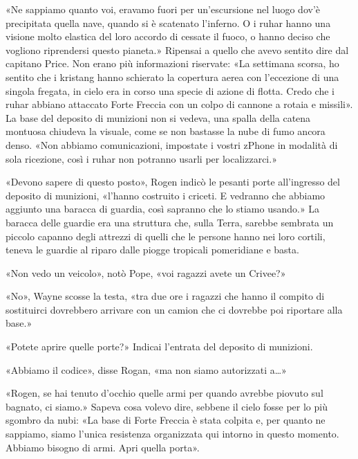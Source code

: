 «Ne sappiamo quanto voi, eravamo fuori per un'escursione nel luogo dov'è
precipitata quella nave, quando si è scatenato l'inferno. O i ruhar
hanno una visione molto elastica del loro accordo di cessate il fuoco, o
hanno deciso che vogliono riprendersi questo pianeta.» Ripensai a quello
che avevo sentito dire dal capitano Price. Non erano più informazioni
riservate: «La settimana scorsa, ho sentito che i kristang hanno
schierato la copertura aerea con l'eccezione di una singola fregata, in
cielo era in corso una specie di azione di flotta. Credo che i ruhar
abbiano attaccato Forte Freccia con un colpo di cannone a rotaia e
missili». La base del deposito di munizioni non si vedeva, una spalla
della catena montuosa chiudeva la visuale, come se non bastasse la nube
di fumo ancora denso. «Non abbiamo comunicazioni, impostate i vostri
zPhone in modalità di sola ricezione, così i ruhar non potranno usarli
per localizzarci.»

\hfill\break

«Devono sapere di questo posto», Rogen indicò le pesanti porte
all'ingresso del deposito di munizioni, «l'hanno costruito i criceti. E
vedranno che abbiamo aggiunto una baracca di guardia, così sapranno che
lo stiamo usando.» La baracca delle guardie era una struttura che, sulla
Terra, sarebbe sembrata un piccolo capanno degli attrezzi di quelli che
le persone hanno nei loro cortili, teneva le guardie al riparo dalle
piogge tropicali pomeridiane e basta.

«Non vedo un veicolo», notò Pope, «voi ragazzi avete un Crivee?»

«No», Wayne scosse la testa, «tra due ore i ragazzi che hanno il compito
di sostituirci dovrebbero arrivare con un camion che ci dovrebbe poi
riportare alla base.»

«Potete aprire quelle porte?» Indicai l'entrata del deposito di
munizioni.

«Abbiamo il codice», disse Rogan, «ma non siamo autorizzati a\ldots»

«Rogen, se hai tenuto d'occhio quelle armi per quando avrebbe piovuto
sul bagnato, ci siamo.» Sapeva cosa volevo dire, sebbene il cielo fosse
per lo più sgombro da nubi: «La base di Forte Freccia è stata colpita e,
per quanto ne sappiamo, siamo l'unica resistenza organizzata qui intorno
in questo momento. Abbiamo bisogno di armi. Apri quella porta».

\hfill\break

